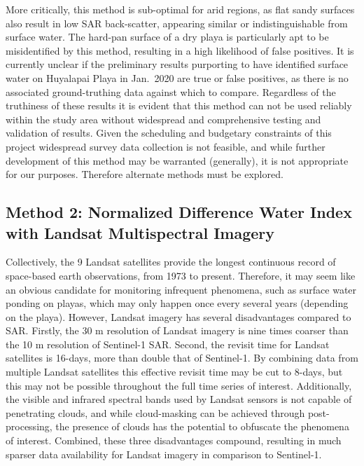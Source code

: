 \documentclass[
]{agujournal2019}
\begin{document}
More critically, this method is sub-optimal for arid regions, as flat
sandy surfaces also result in low SAR back-scatter, appearing similar or
indistinguishable from surface water. The hard-pan surface of a dry
playa is particularly apt to be misidentified by this method, resulting
in a high likelihood of false positives. It is currently unclear if the
preliminary results purporting to have identified surface water on
Huyalapai Playa in Jan.~2020 are true or false positives, as there is no
associated ground-truthing data against which to compare. Regardless of
the truthiness of these results it is evident that this method can not
be used reliably within the study area without widespread and
comprehensive testing and validation of results. Given the scheduling
and budgetary constraints of this project widespread survey data
collection is not feasible, and while further development of this method
may be warranted (generally), it is not appropriate for our purposes.
Therefore alternate methods must be explored.

\subsection{Method 2: Normalized Difference Water Index with Landsat
Multispectral
Imagery}\label{method-2-normalized-difference-water-index-with-landsat-multispectral-imagery}

Collectively, the 9 Landsat satellites provide the longest continuous
record of space-based earth observations, from 1973 to present.
Therefore, it may seem like an obvious candidate for monitoring
infrequent phenomena, such as surface water ponding on playas, which may
only happen once every several years (depending on the playa). However,
Landsat imagery has several disadvantages compared to SAR. Firstly, the
30 m resolution of Landsat imagery is nine times coarser than the 10 m
resolution of Sentinel-1 SAR. Second, the revisit time for Landsat
satellites is 16-days, more than double that of Sentinel-1. By combining
data from multiple Landsat satellites this effective revisit time may be
cut to 8-days, but this may not be possible throughout the full time
series of interest. Additionally, the visible and infrared spectral
bands used by Landsat sensors is not capable of penetrating clouds, and
while cloud-masking can be achieved through post-processing, the
presence of clouds has the potential to obfuscate the phenomena of
interest. Combined, these three disadvantages compound, resulting in
much sparser data availability for Landsat imagery in comparison to
Sentinel-1.
\end{document}
